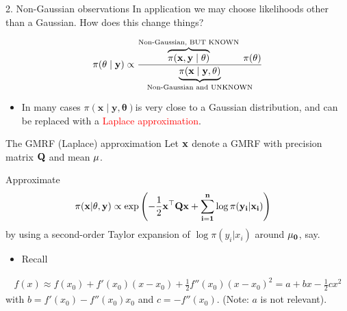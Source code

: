\documentclass[
  ignorenonframetext,
]{beamer}
\providecommand{\tightlist}{%
  \setlength{\itemsep}{0pt}\setlength{\parskip}{0pt}}
\begin{document}
\begin{frame}{2. Non-Gaussian observations}
\protect\hypertarget{non-gaussian-observations}{}
In application we may choose likelihoods other than a Gaussian. How does
this change things?

\[
\pi(\bf{\theta} \mid \bf{y}) \propto \frac{
            \overbrace{\pi(\bf{x}, \bf{y}\mid \bf{\theta})}^{\text{Non-Gaussian, BUT KNOWN}}
        \; \pi(\bf{\theta})}{\underbrace{\pi(\bf{x} \mid \bf{y},
            \bf{\theta})}_{\text{Non-Gaussian and UNKNOWN}}}
\]

\begin{itemize}
\tightlist
\item
  In many cases
  \(\pi(\boldsymbol{x} \mid \boldsymbol{y}, \boldsymbol{\theta})\)is
  very close to a Gaussian distribution, and can be replaced with a
  \textcolor{red}{Laplace approximation}.
\end{itemize}
\end{frame}

\begin{frame}{The GMRF (Laplace) approximation}
\protect\hypertarget{the-gmrf-laplace-approximation}{}
Let \(\bf{x}\) denote a GMRF with precision matrix \(\bf{Q}\) and mean
\(\bf{\mu}\).

Approximate \[
\begin{aligned}
\pi(\bf{x}|\theta,\bf{y}) &\propto
            \exp\left(-\frac{1}{2}\bf{x}^\top \bf{Q}\bf{x} + \sum_{i=1}^n \log \pi (y_i|x_i)\right)
\end{aligned}
\] by using a second-order Taylor expansion of \(\log \pi (y_i|x_i)\)
around \(\bf{\mu}_0\), say.

\begin{itemize}
\tightlist
\item
  Recall
\end{itemize}

\[
\begin{aligned}
        f(x) \approx f(x_0) + f'(x_0)(x-x_0)+ \frac{1}{2} f''(x_0)(x-x_0)^2
        = a+ bx - \frac{1}{2}cx^2
\end{aligned}
\] with \(b=f'(x_0) - f''(x_0)x_0\) and \(c = -f''(x_0)\). (Note: \(a\)
is not relevant).
\end{frame}
\end{document}
